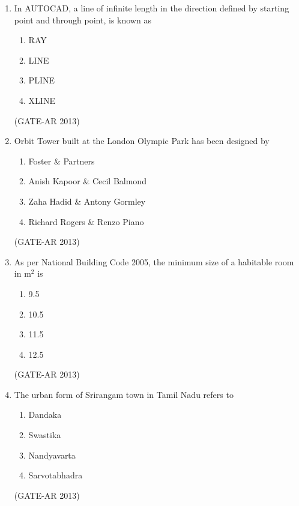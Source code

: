 \documentclass[a4paper,10pt]{article}
\begin{document}
\begin{enumerate}
    \item In AUTOCAD, a line of infinite length in the direction defined by starting point and through point, is known as 
    \begin{multicols}{4}
	\begin{enumerate}
        \item RAY
        \item LINE
        \item PLINE
        \item XLINE
    \end{enumerate}
	\end{multicols}
    \hfill (GATE-AR 2013)
    
    \item Orbit Tower built at the London Olympic Park has been designed by 
    \begin{enumerate}
        \item Foster \& Partners
        \item Anish Kapoor \& Cecil Balmond
        \item Zaha Hadid \& Antony Gormley
        \item Richard Rogers \& Renzo Piano
    \end{enumerate}
    \hfill (GATE-AR 2013)
    
    \item As per National Building Code 2005, the minimum size of a habitable room in m$^2$ is 
    \begin{multicols}{4}
	\begin{enumerate}
        \item 9.5
        \item 10.5
        \item 11.5
        \item 12.5
    \end{enumerate}
	\end{multicols}
    \hfill (GATE-AR 2013)
    
    \item The urban form of Srirangam town in Tamil Nadu refers to 
    \begin{multicols}{4}
	\begin{enumerate}
        \item Dandaka
        \item Swastika
        \item Nandyavarta
        \item Sarvotabhadra
    \end{enumerate}
	\end{multicols}
    \hfill (GATE-AR 2013)
    

\end{enumerate}
\end{document}
